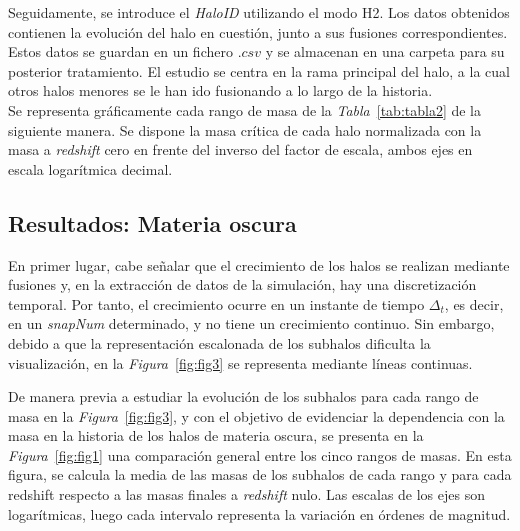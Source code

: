 Seguidamente, se introduce el \textit{HaloID} utilizando el modo H2. Los datos obtenidos contienen la evolución del halo en cuestión, junto a sus fusiones correspondientes. Estos datos se guardan en un fichero $.csv$ y se almacenan en una carpeta para su posterior tratamiento. El estudio se centra en la rama principal del halo, a la cual otros halos menores se le han ido fusionando a lo largo de la historia. \\

Se representa gráficamente cada rango de masa de la \textit{Tabla}~\ref{tab:tabla2} de la siguiente manera. Se dispone la masa crítica de cada halo normalizada con la masa a \textit{redshift} cero en frente del inverso del factor de escala, ambos ejes en escala logarítmica decimal. \\

\subsection{Resultados: Materia oscura}
\label{subsec:2_B}

En primer lugar, cabe señalar que el crecimiento de los halos se realizan mediante fusiones y, en la extracción de datos de la simulación, hay una discretización temporal. Por tanto, el crecimiento ocurre en un instante de tiempo $\Delta_t$, es decir, en un \textit{snapNum} determinado, y no tiene un crecimiento continuo. Sin embargo, debido a que la representación escalonada de los subhalos dificulta la visualización, en la \textit{Figura}~\ref{fig:fig3} se representa mediante líneas continuas. \\

\begin{comment}
El objetivo de mostrar la dependencia con la masa en la historia de los halos de materia oscura, se ha presentado la \textit{Figura}~\ref{fig:fig1} a modo de comparación de las medias de los halos pertenecientes a cada intervalo de masas
\end{comment}

De manera previa a estudiar la evolución de los subhalos para cada rango de masa en la \textit{Figura}~\ref{fig:fig3}, y con el objetivo de evidenciar la dependencia con la masa en la historia de los halos de materia oscura, se presenta en la \textit{Figura}~\ref{fig:fig1} una comparación general entre los cinco rangos de masas. En esta figura, se calcula la media de las masas de los subhalos de cada rango y para cada redshift respecto a las masas finales a \textit{redshift} nulo. Las escalas de los ejes son logarítmicas, luego cada intervalo representa la variación en órdenes de magnitud. \\

